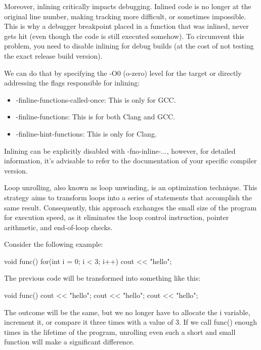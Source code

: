 Moreover, inlining critically impacts debugging. Inlined code is no longer at the original line number, making tracking more difficult, or sometimes impossible. This is why a debugger breakpoint placed in a function that was inlined, never gets hit (even though the code is still executed somehow). To circumvent this problem, you need to disable inlining for debug builds (at the cost of not testing the exact release build version).

We can do that by specifying the -O0 (o-zero) level for the target or directly addressing the flags responsible for inlining:

\begin{itemize}
\item
-finline-functions-called-once: This is only for GCC.

\item
-finline-functions: This is for both Clang and GCC.

\item
-finline-hint-functions: This is only for Clang.
\end{itemize}

Inlining can be explicitly disabled with -fno-inline-..., however, for detailed information, it’s advisable to refer to the documentation of your specific compiler version.


Loop unrolling, also known as loop unwinding, is an optimization technique. This strategy aims to transform loops into a series of statements that accomplish the same result. Consequently, this approach exchanges the small size of the program for execution speed, as it eliminates the loop control instruction, pointer arithmetic, and end-of-loop checks.

Consider the following example:

\begin{cpp}
void func() {
    for(int i = 0; i < 3; i++)
    cout << "hello\n";
}
\end{cpp}

The previous code will be transformed into something like this:

\begin{cpp}
void func() {
    cout << "hello\n";
    cout << "hello\n";
    cout << "hello\n";
}
\end{cpp}

The outcome will be the same, but we no longer have to allocate the i variable, increment it, or compare it three times with a value of 3. If we call func() enough times in the lifetime of the program, unrolling even such a short and small function will make a significant difference.

